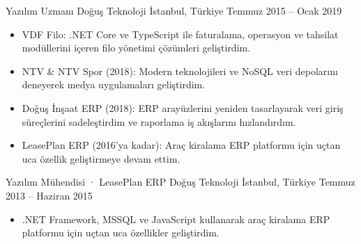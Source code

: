 \resumeSubheading
  {Yazılım Uzmanı}
  {Doğuş Teknoloji}
  {İstanbul, Türkiye}
  {Temmuz 2015 -- Ocak 2019}
\begin{itemize}
  \item VDF Filo: .NET Core ve TypeScript ile faturalama, operasyon ve tahsilat modüllerini içeren filo yönetimi çözümleri geliştirdim.
  \item NTV \& NTV Spor (2018): Modern teknolojileri ve NoSQL veri depolarını deneyerek medya uygulamaları geliştirdim.
  \item Doğuş İnşaat ERP (2018): ERP arayüzlerini yeniden tasarlayarak veri giriş süreçlerini sadeleştirdim ve raporlama iş akışlarını hızlandırdım.
  \item LeasePlan ERP (2016'ya kadar): Araç kiralama ERP platformu için uçtan uca özellik geliştirmeye devam ettim.
\end{itemize}
\vspace{0.3em}

\resumeSubheading
  {Yazılım Mühendisi · LeasePlan ERP}
  {Doğuş Teknoloji}
  {İstanbul, Türkiye}
  {Temmuz 2013 -- Haziran 2015}
\begin{itemize}
  \item .NET Framework, MSSQL ve JavaScript kullanarak araç kiralama ERP platformu için uçtan uca özellikler geliştirdim.
\end{itemize}
